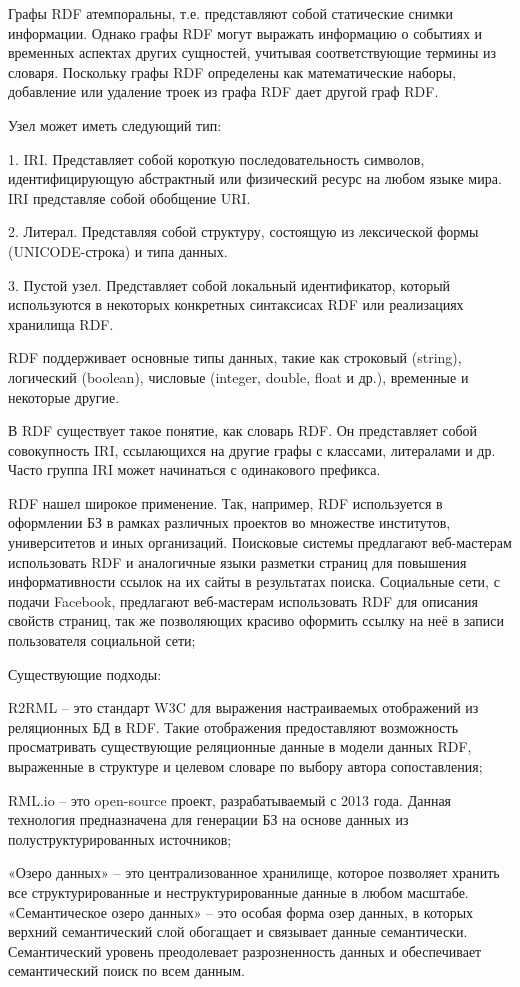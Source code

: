 Графы RDF атемпоральны, т.е. представляют собой статические снимки информации. Однако графы RDF могут выражать информацию о событиях и временных аспектах других сущностей, учитывая соответствующие термины из словаря. Поскольку графы RDF определены как математические наборы, добавление или удаление троек из графа RDF дает другой граф RDF.

Узел может иметь следующий тип:

1. IRI. Представляет собой короткую последовательность символов, идентифицирующую абстрактный или физический ресурс на любом языке мира. IRI представляе собой обобщение URI.

2. Литерал. Представляя собой структуру, состоящую из лексической формы (UNICODE-строка) и типа данных.

3. Пустой узел. Представляет собой локальный идентификатор, который используются в некоторых конкретных синтаксисах RDF или реализациях хранилища RDF.

RDF поддерживает основные типы данных, такие как строковый (string), логический (boolean), числовые (integer, double, float и др.), временные и некоторые другие.

В RDF существует такое понятие, как словарь RDF. Он представляет собой совокупность IRI, ссылающихся на другие графы с классами, литералами и др. Часто группа IRI может начинаться с одинакового префикса.

RDF нашел широкое применение. Так, например, RDF используется в оформлении БЗ в рамках различных проектов во множестве институтов, университетов и иных организаций. Поисковые системы предлагают веб-мастерам использовать RDF и аналогичные языки разметки страниц для повышения информативности ссылок на их сайты в результатах поиска. Социальные сети, с подачи Facebook, предлагают веб-мастерам использовать RDF для описания свойств страниц, так же позволяющих красиво оформить ссылку на неё в записи пользователя социальной сети;

Существующие подходы:
\begin{textitemize}
    \item R2RML – это стандарт W3C для выражения настраиваемых отображений из реляционных БД в RDF. Такие отображения предоставляют возможность просматривать существующие реляционные данные в модели данных RDF, выраженные в структуре и целевом словаре по выбору автора сопоставления;
    \item RML.io – это open-source проект, разрабатываемый с 2013 года. Данная технология предназначена для генерации БЗ на основе данных из полуструктурированных источников;
    \item «Озеро данных» – это централизованное хранилище, которое позволяет хранить все структурированные и неструктурированные данные в любом масштабе. «Семантическое озеро данных» – это особая форма озер данных, в которых верхний семантический слой обогащает и связывает данные семантически. Семантический уровень преодолевает разрозненность данных и обеспечивает семантический поиск по всем данным.
\end{textitemize}

